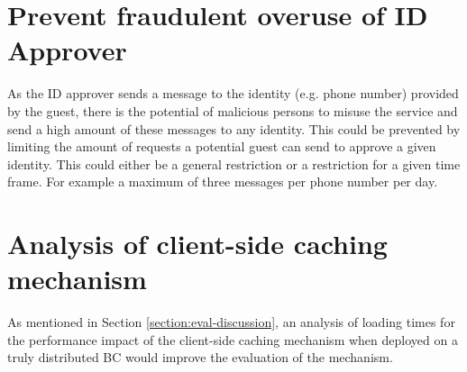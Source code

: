 \section{Prevent fraudulent overuse of ID Approver}
As the ID approver sends a message to the identity (e.g. phone number) provided by the guest, there is the potential of malicious persons to misuse the service and send a high amount of these messages to any identity. This could be prevented by limiting the amount of requests a potential guest can send to approve a given identity. This could either be a general restriction or a restriction for a given time frame. For example a maximum of three messages per phone number per day.

\section{Analysis of client-side caching mechanism}
As mentioned in Section \ref{section:eval-discussion}, an analysis of loading times for the performance impact of the client-side caching mechanism when deployed on a truly distributed BC would improve the evaluation of the mechanism. 
